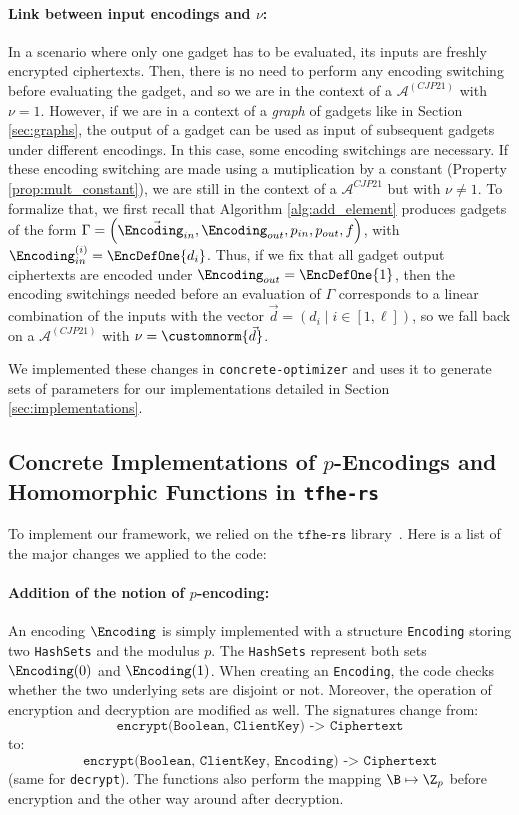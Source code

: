 \paragraph{Link between input encodings and $\nu$:} In a scenario where only one gadget has to be evaluated, its inputs are freshly encrypted ciphertexts. Then, there is no need to perform any encoding switching before evaluating the gadget, and so we are in the context of a $\mathcal{A}^{(CJP21)}$ with $\nu = 1$. However, if we are in a context of a \textit{graph} of gadgets like in Section \ref{sec:graphs}, the output of a gadget can be used as input of subsequent gadgets under different encodings. In this case, some encoding switchings are necessary. If these encoding switching are made using a mutiplication by a constant (Property \ref{prop:mult_constant}), we are still in the context of a $\mathcal{A}^{CJP21}$ but with $\nu \ne 1$. 
To formalize that, we first recall that Algorithm \ref{alg:add_element} produces gadgets of the form $\Gamma = \left (\vec{\Encoding_{in}}, \Encoding_{out}, p_{in}, p_{out}, f \right )$, with $\Encoding_{in}^{(i)} = \EncDefOne{d_i}$. Thus, if we fix that all gadget output ciphertexts are encoded under $\Encoding_{out} = \EncDefOne{1}$, then the encoding switchings needed before an evaluation of $\Gamma$ corresponds to a linear combination of the inputs with the vector $\vec d = (d_i \mid i \in [1, \ell])$, so we fall back on a $\mathcal{A}^{(CJP21)}$ with $\nu = \customnorm{\vec d}$.


We implemented these changes in \texttt{concrete-optimizer} and uses it to generate sets of parameters for our implementations detailed in Section \ref{sec:implementations}.

\subsection{Concrete Implementations of $p$-Encodings and Homomorphic Functions in \texttt{tfhe-rs}}
\label{sec:library}


To implement our framework, we relied on the $\texttt{tfhe-rs}$ library~\cite{tfhe-rs}. Here is a list of the major changes we applied to the code:

\paragraph{Addition of the notion of $p$-encoding: } An encoding $\Encoding$ is simply implemented with a structure \texttt{Encoding} storing two \texttt{HashSets} and the modulus $p$. The \texttt{HashSets} represent both sets $\Encoding(0)$ and $\Encoding(1)$. When creating an \texttt{Encoding}, the code checks whether the two underlying sets are disjoint or not. Moreover, the operation of encryption and decryption are modified as well. The signatures change from:\[\texttt{encrypt(Boolean, ClientKey) -> Ciphertext}\] to: \[\texttt{encrypt(Boolean, ClientKey, Encoding) -> Ciphertext}\] (same for \texttt{decrypt}). The functions also perform the mapping $\B \mapsto \Z_p$ before encryption and the other way around after decryption.


